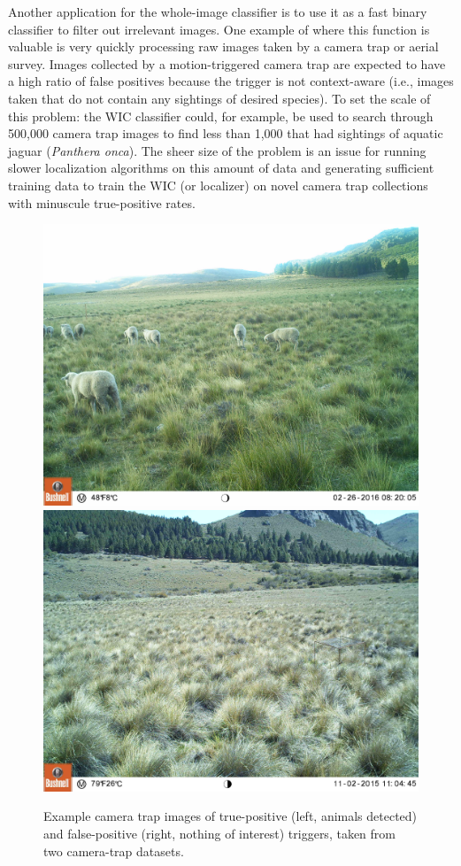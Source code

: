 Another application for the whole-image classifier is to use it as a fast binary classifier to filter out irrelevant images.  One example of where this function is valuable is very quickly processing raw images taken by a camera trap or aerial survey.  Images collected by a motion-triggered camera trap are expected to have a high ratio of false positives because the trigger is not context-aware (i.e., images taken that do not contain any sightings of desired species).  To set the scale of this problem: the WIC classifier could, for example, be used to search through 500,000 camera trap images to find less than 1,000 that had sightings of aquatic jaguar (\textit{Panthera onca}).  The sheer size of the problem is an issue for running slower localization algorithms on this amount of data and generating sufficient training data to train the WIC (or localizer) on novel camera trap collections with minuscule true-positive rates.

\begin{figure}[!t]
    \begin{center}
        \includegraphics[width=0.47\linewidth]{resources/cameratrap-dataset1-positive.pdf}
        \hspace{1mm}
        \includegraphics[width=0.47\linewidth]{resources/cameratrap-dataset1-negative.pdf}
    \end{center}
    \caption{Example camera trap images of true-positive (left, animals detected) and false-positive (right, nothing of interest) triggers, taken from two camera-trap datasets.}
    \label{fig:example-wic-cameratrap}
\end{figure}

